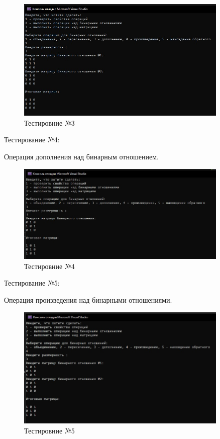 \documentclass[bachelor, och, labwork]{shiza}
\begin{document}
	
	\begin{figure}[H]
		\centering
		\includegraphics[width=0.9\textwidth]{test_3}
		\caption{Тестировние №3}
		\label{fig:test_3}
	\end{figure}
	
		Тестирование №4:
	
Операция дополнения над бинарным отношением.
	
	
	\begin{figure}[H]
		\centering
		\includegraphics[width=0.9\textwidth]{test_4}
		\caption{Тестировние №4}
		\label{fig:test_4}
	\end{figure}

	Тестирование №5:

Операция произведения над бинарными отношениями.


\begin{figure}[H]
	\centering
	\includegraphics[width=0.9\textwidth]{test_5}
	\caption{Тестировние №5}
	\label{fig:test_5}
\end{figure}
\end{document}
